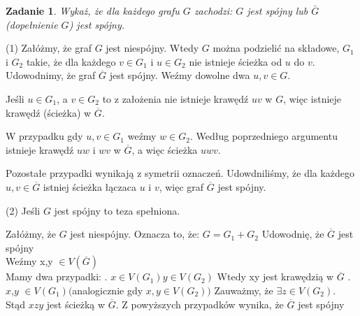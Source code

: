 \documentclass{mwart}
\newtheorem{zad}{Zadanie}[section]
\begin{document}
\begin{zad}
    Wykaż, że dla każdego grafu $G$ zachodzi: $G$ jest spójny lub $\bar{G}$ (dopełnienie $G$) jest spójny.
\end{zad}
\begin{mdframed}

     (1) Załóżmy, że graf $G$ jest niespójny. Wtedy $G$ można podzielić na 
     składowe, $G_1$ i $G_2$ takie, że dla każdego $v \in G_1$ i $u \in G_2$ 
     nie istnieje ścieżka od $u$ do $v$. Udowodnimy, że graf $\overline{G}$ jest 
     spójny. Weźmy dowolne dwa $u, v \in G$. 
     
         Jeśli $u \in G_1$, a $v \in G_2$ to 
     z założenia nie istnieje krawędź $uv$ w $G$, więc istnieje krawędź (ścieżka) w 
     $\overline{G}$. 
     
         W przypadku gdy $u, v \in G_1$ weźmy $w \in G_2$. Według poprzedniego 
     argumentu istnieje krawędź $uw$ i $wv$ w $\overline{G}$, a więc ścieżka $uwv$. 
     
         Pozostałe przypadki wynikają z symetrii oznaczeń. Udowdniliśmy, że dla każdego 
     $u, v \in \overline{G}$ istniej ścieżka łączaca $u$ i $v$, więc graf $\overline{G}$ 
     jest spójny.
 
     (2) Jeśli $G$ jest spójny to teza spełniona.
\end{mdframed}
\begin{mdframed}
    Załóżmy, że $G$ jest niespójny.
    Oznacza to, że:
    $G = G_1 + G_2$
    \newline
    Udowodnię, że $\overline{G}$ jest spójny \\

    Weźmy x,y $\in V(\overline{G}) $\\
    Mamy dwa przypadki:
    . $x \in V(G_1)  y \in V(G_2)$
    \newline
    Wtedy xy jest krawędzią w $\overline{G}$
    \newline{}. $x$,$y$ $\in V(G_1) ($analogicznie gdy $ x,y \in V(G_2))$
    Zauważmy, że \( \exists z \in V(G_2) \).\\
Stąd \( xzy \) jest ścieżką w \( \overline{G} \).
\newline\newline
Z powyższych przypadków wynika, że $\overline{G}$ jest spójny
\end{mdframed}
\end{document}
